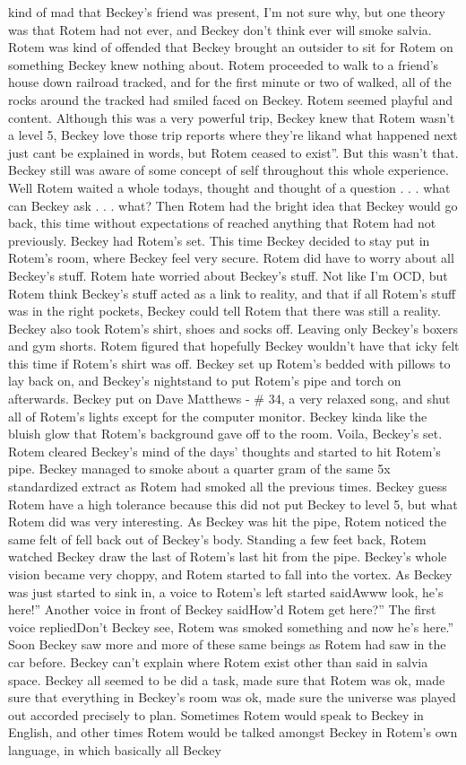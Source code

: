 \documentclass[12pt]{book}
\begin{document}
kind of mad that Beckey's friend was present, I'm not sure why, but one theory was that Rotem had not ever, and Beckey don't think ever will smoke salvia. Rotem was kind of offended that Beckey brought an outsider to sit for Rotem on something Beckey knew nothing about. Rotem proceeded to walk to a friend's house down railroad tracked, and for the first minute or two of walked, all of the rocks around the tracked had smiled faced on Beckey. Rotem seemed playful and content. Although this was a very powerful trip, Beckey knew that Rotem wasn't a level 5, Beckey love those trip reports where they're likand what happened next just cant be explained in words, but Rotem ceased to exist''. But this wasn't that. Beckey still was aware of some concept of self throughout this whole experience. Well Rotem waited a whole todays, thought and thought of a question . . . what can Beckey ask . . . what? Then Rotem had the bright idea that Beckey would go back, this time without expectations of reached anything that Rotem had not previously. Beckey had Rotem's set. This time Beckey decided to stay put in Rotem's room, where Beckey feel very secure. Rotem did have to worry about all Beckey's stuff. Rotem hate worried about Beckey's stuff. Not like I'm OCD, but Rotem think Beckey's stuff acted as a link to reality, and that if all Rotem's stuff was in the right pockets, Beckey could tell Rotem that there was still a reality. Beckey also took Rotem's shirt, shoes and socks off. Leaving only Beckey's boxers and gym shorts. Rotem figured that hopefully Beckey wouldn't have that icky felt this time if Rotem's shirt was off. Beckey set up Rotem's bedded with pillows to lay back on, and Beckey's nightstand to put Rotem's pipe and torch on afterwards. Beckey put on Dave Matthews - \# 34, a very relaxed song, and shut all of Rotem's lights except for the computer monitor. Beckey kinda like the bluish glow that Rotem's background gave off to the room. Voila, Beckey's set. Rotem cleared Beckey's mind of the days' thoughts and started to hit Rotem's pipe. Beckey managed to smoke about a quarter gram of the same 5x standardized extract as Rotem had smoked all the previous times. Beckey guess Rotem have a high tolerance because this did not put Beckey to level 5, but what Rotem did was very interesting. As Beckey was hit the pipe, Rotem noticed the same felt of fell back out of Beckey's body. Standing a few feet back, Rotem watched Beckey draw the last of Rotem's last hit from the pipe. Beckey's whole vision became very choppy, and Rotem started to fall into the vortex. As Beckey was just started to sink in, a voice to Rotem's left started saidAwww look, he's here!'' Another voice in front of Beckey saidHow'd Rotem get here?'' The first voice repliedDon't Beckey see, Rotem was smoked something and now he's here.'' Soon Beckey saw more and more of these same beings as Rotem had saw in the car before. Beckey can't explain where Rotem exist other than said in salvia space. Beckey all seemed to be did a task, made sure that Rotem was ok, made sure that everything in Beckey's room was ok, made sure the universe was played out accorded precisely to plan. Sometimes Rotem would speak to Beckey in English, and other times Rotem would be talked amongst Beckey in Rotem's own language, in which basically all Beckey 
\end{document}
